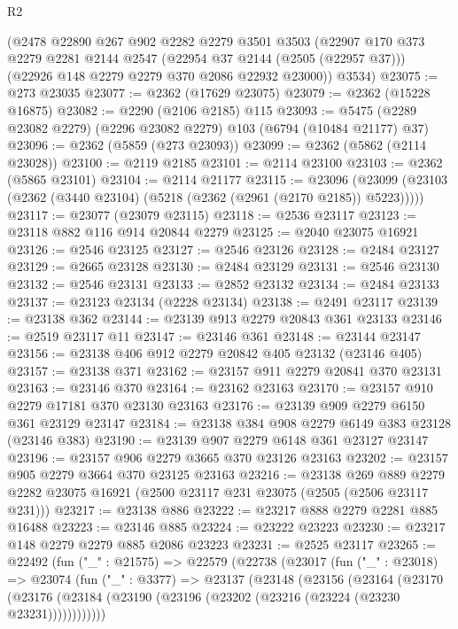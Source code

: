 \begin{lexlean}{R2}
\begin{coremodule}
    (@2478
      @22890
      @267
      @902
      @2282
      @2279
      @3501
      @3503
      (@22907
        @170
        @373
        @2279
        @2281
        @2144
        @2547
        (@22954 @37 @2144 (@2505 (@22957 @37)))
        (@22926 @148 @2279 @2279 @370 @2086 @22932 @23000))
      @3534)
@23075 := @273 @23035
@23077 := @2362 (@17629 @23075)
@23079 := @2362 (@15228 @16875)
@23082 := @2290 (@2106 @2185) @115
@23093 := @5475 (@2289 @23082 @2279) (@2296 @23082 @2279) @103 (@6794 (@10484 @21177) @37)
@23096 := @2362 (@5859 (@273 @23093))
@23099 := @2362 (@5862 (@2114 @23028))
@23100 := @2119 @2185
@23101 := @2114 @23100
@23103 := @2362 (@5865 @23101)
@23104 := @2114 @21177
@23115 := @23096
    (@23099 (@23103 (@2362 (@3440 @23104) (@5218 (@2362 (@2961 (@2170 @2185)) @5223)))))
@23117 := @23077 (@23079 @23115)
@23118 := @2536 @23117
@23123 := @23118 @882 @116 @914 @20844 @2279
@23125 := @2040 @23075 @16921
@23126 := @2546 @23125
@23127 := @2546 @23126
@23128 := @2484 @23127
@23129 := @2665 @23128
@23130 := @2484 @23129
@23131 := @2546 @23130
@23132 := @2546 @23131
@23133 := @2852 @23132
@23134 := @2484 @23133
@23137 := @23123 @23134 (@2228 @23134)
@23138 := @2491 @23117
@23139 := @23138 @362
@23144 := @23139 @913 @2279 @20843 @361 @23133
@23146 := @2519 @23117 @11
@23147 := @23146 @361
@23148 := @23144 @23147
@23156 := @23138 @406 @912 @2279 @20842 @405 @23132 (@23146 @405)
@23157 := @23138 @371
@23162 := @23157 @911 @2279 @20841 @370 @23131
@23163 := @23146 @370
@23164 := @23162 @23163
@23170 := @23157 @910 @2279 @17181 @370 @23130 @23163
@23176 := @23139 @909 @2279 @6150 @361 @23129 @23147
@23184 := @23138 @384 @908 @2279 @6149 @383 @23128 (@23146 @383)
@23190 := @23139 @907 @2279 @6148 @361 @23127 @23147
@23196 := @23157 @906 @2279 @3665 @370 @23126 @23163
@23202 := @23157 @905 @2279 @3664 @370 @23125 @23163
@23216 := @23138
    @269
    @889
    @2279
    @2282
    @23075
    @16921
    (@2500 @23117 @231 @23075 (@2505 (@2506 @23117 @231)))
@23217 := @23138 @886
@23222 := @23217 @888 @2279 @2281 @885 @16488
@23223 := @23146 @885
@23224 := @23222 @23223
@23230 := @23217 @148 @2279 @2279 @885 @2086 @23223
@23231 := @2525 @23117
@23265 := @22492
    (fun ("_" : @21575) =>
    @22579
      (@22738
        (@23017
          (fun ("_" : @23018) =>
          @23074
            (fun ("_" : @3377) =>
            @23137
              (@23148
                (@23156
                  (@23164
                    (@23170
                      (@23176
                        (@23184 (@23190 (@23196 (@23202 (@23216 (@23224 (@23230 @23231))))))))))))

\end{coremodule}
\end{lexlean}
